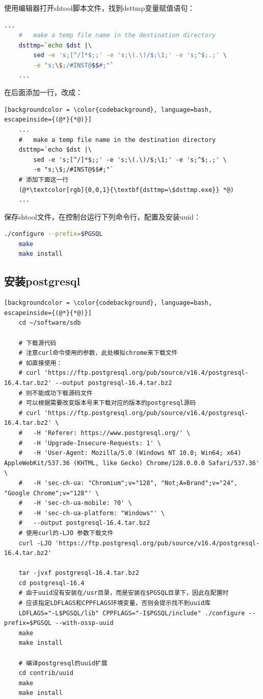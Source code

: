 使用编辑器打开shtool脚本文件，找到dsttmp变量赋值语句：
\begin{lstlisting}[backgroundcolor = \color{codebackground}, language=bash]
	...
	#   make a temp file name in the destination directory
	dsttmp=`echo $dst |\
		sed -e 's;[^/]*$;;' -e 's;\(.\)/$;\1;' -e 's;^$;.;' \
		-e "s;\$;/#INST@$$#;"`
	...
\end{lstlisting}

在后面添加一行，改成：

\begin{lstlisting}[backgroundcolor = \color{codebackground}, language=bash, escapeinside={(@*}{*@)}]
	...
	#   make a temp file name in the destination directory
	dsttmp=`echo $dst |\
		sed -e 's;[^/]*$;;' -e 's;\(.\)/$;\1;' -e 's;^$;.;' \
		-e "s;\$;/#INST@$$#;"`
	# 添加下面这一行
	(@*\textcolor[rgb]{0,0,1}{\textbf{dsttmp=\$dsttmp.exe}} *@)
	...
\end{lstlisting}

保存shtool文件，在控制台运行下列命令行，配置及安装uuid：

\begin{lstlisting}[backgroundcolor = \color{codebackground}, language=bash]
	./configure --prefix=$PGSQL
	make 
	make install
\end{lstlisting}

\subsection{安装postgresql}
\begin{lstlisting}[backgroundcolor = \color{codebackground}, language=bash, escapeinside={(@*}{*@)}]
	cd ~/software/sdb
	
	# 下载源代码
	# 注意curl命令使用的参数，此处模拟chrome来下载文件
	# 如直接使用：
	# curl 'https://ftp.postgresql.org/pub/source/v16.4/postgresql-16.4.tar.bz2' --output postgresql-16.4.tar.bz2
	# 则不能成功下载源码文件
	# 可以根据需要改变版本号来下载对应的版本的postgresql源码
	# curl 'https://ftp.postgresql.org/pub/source/v16.4/postgresql-16.4.tar.bz2' \
	#	-H 'Referer: https://www.postgresql.org/' \
	#	-H 'Upgrade-Insecure-Requests: 1' \
	#	-H 'User-Agent: Mozilla/5.0 (Windows NT 10.0; Win64; x64) AppleWebKit/537.36 (KHTML, like Gecko) Chrome/128.0.0.0 Safari/537.36' \
	#	-H 'sec-ch-ua: "Chromium";v="128", "Not;A=Brand";v="24", "Google Chrome";v="128"' \
	#	-H 'sec-ch-ua-mobile: ?0' \
	#	-H 'sec-ch-ua-platform: "Windows"' \
	#	--output postgresql-16.4.tar.bz2
	# 使用curl的-LJO 参数下载文件
	curl -LJO 'https://ftp.postgresql.org/pub/source/v16.4/postgresql-16.4.tar.bz2'
	
	tar -jvxf postgresql-16.4.tar.bz2
	cd postgresql-16.4
	# 由于uuid没有安装在/usr目录，而是安装在$PGSQL目录下，因此在配置时
	# 应该指定LDFLAGS和CPPFLAGS环境变量，否则会提示找不到uuid库
	LDFLAGS="-L$PGSQL/lib" CPPFLAGS="-I$PGSQL/include" ./configure --prefix=$PGSQL --with-ossp-uuid
	make
	make install
	
	# 编译postgresql的uuid扩展
	cd contrib/uuid
	make
	make install
\end{lstlisting}

